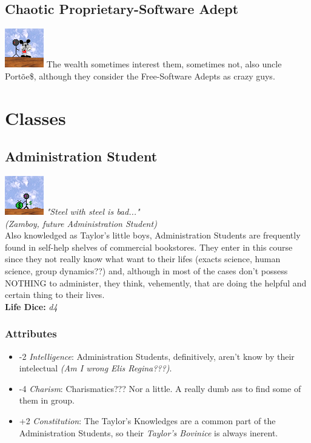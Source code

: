 \documentclass[ letterpaper,12pt]{article}
\begin{document}
\subsection{Chaotic Proprietary-Software Adept}
\includegraphics{../data/alignment/Img/niquel.png}
The wealth sometimes interest them, sometimes not, also uncle Portõe\$,
although they consider the Free-Software Adepts as crazy guys.

\section{Classes}

\subsection{Administration Student}
\includegraphics{../data/classes/Img/administracao.png}
{\it "Steel with steel is bad..."\\(Zamboy, future Administration Student)}\\

Also knowledged as Taylor's  little boys, Administration Students are frequently found in self-help shelves of commercial bookstores. They enter in this course  since they not really know what want to their lifes (exacts science, human science, group  dynamics??) and, although in most of the cases don't possess NOTHING to administer, they think, vehemently, that are doing the helpful and certain thing to their lives.\\ 

{\bf Life Dice:} {\it d4}

\subsubsection{Attributes}
\begin{itemize}
\item{-2 {\it Intelligence}: Administration Students, definitively,  aren't know by their intelectual {\it (Am I wrong Elis Regina???)}.}
\item{-4 {\it Charism}: Charismatics??? Nor a little. A really dumb ass to find some of them in group.}
\item{+2 {\it Constitution}: The Taylor's Knowledges are a common part of the Administration Students, so their {\it Taylor's Bovinice} is always inerent.}
\end{itemize}
\end{document}
